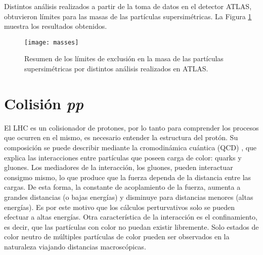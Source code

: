 Distintos análisis realizados a partir de la toma de datos en el detector ATLAS, obtuvieron límites para las masas de las partículas supersimétricas. La Figura \ref{masses} muestra los resultados obtenidos.

\begin{figure}[ht]
\centering
\texttt{[image: masses]}
\caption{Resumen de los límites de exclusión en la masa de las partículas supersimétricas por distintos análisis realizados en ATLAS. }
\label{masses}
\end{figure}



\section{Colisión \textit{pp}}

El LHC es un colisionador de protones, por lo tanto para comprender los procesos que ocurren en el mismo, es necesario entender la estructura del protón. Su composición se puede describir mediante la cromodinámica cuántica (QCD) \cite{ellis1996}, que explica las interacciones entre partículas que poseen carga de color: quarks y gluones. Los mediadores de la interacción, los gluones, pueden interactuar consigmo mismo, lo que produce que la fuerza dependa de la distancia entre las cargas. De esta forma, la constante de acoplamiento de la fuerza, aumenta a grandes distancias (o bajas energías) y disminuye para distancias menores (altas energías). Es por este motivo que los cálculos perturvativos solo se pueden efectuar a altas energías. Otra característica de la interacción es el confinamiento, es decir, que las partículas con color no puedan existir libremente. Solo estados de color neutro de múltiples partículas de color pueden ser observados en la naturaleza viajando distancias macroscópicas.


